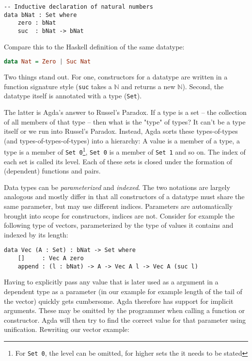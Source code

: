 \begin{lstlisting}[caption={Definition of a type representing the natural numbers},label={lst:tutorial:datatypes},emph={zero,suc}]
-- Inductive declaration of natural numbers
data bNat : Set where
    zero : bNat
    suc  : bNat -> bNat
\end{lstlisting}

Compare this to the Haskell definition of the same datatype:

\begin{lstlisting}[caption={Peano numbers in Haskell},label={lst:haskell:peano},language=haskell,emph={Zero,Suc}]
data Nat = Zero | Suc Nat
\end{lstlisting}

Two things stand out. For one, constructors for a datatype are written in a function signature style (\texttt{suc} takes a \texttt{$\mathbb N$} and returns a new \texttt{$\mathbb N$}). Second, the datatype itself is annotated with a type (\texttt{Set}).

The latter is Agda's answer to Russel's Paradox. If a type is a set -- the collection of all members of that type -- then what is the "type" of types? It can't be a type itself or we run into Russel's Paradox. Instead, Agda sorts these types-of-types (and types-of-types-of-types) into a hierarchy: A value is a member of a type, a type is a member of \texttt{Set 0}\footnote{For \texttt{Set 0}, the level can be omitted, for higher sets the it needs to be stated}, \texttt{Set 0} is a member of \texttt{Set 1} and so on. The index of each set is called its level. Each of these sets is closed under the formation of (dependent) functions and pairs.

Data types can be \emph{parameterized} and \emph{indexed}. The two notations are largely analogous and mostly differ in that all constructors of a datatype must share the same parameter, but may use different indices. Parameters are automatically brought into scope for constructors, indices are not. Consider for example the following type of vectors, parameterized by the type of values it contains and indexed by its length:

\begin{lstlisting}[caption={A simple vector type},label={lst:tutorial:vec},emph={Vec,append}]
data Vec (A : Set) : bNat -> Set where
    []     : Vec A zero
    append : (l : bNat) -> A -> Vec A l -> Vec A (suc l)
\end{lstlisting}

Having to explicitly pass any value that is later used as a argument in a dependent type as a parameter (in our example for example length of the tail of the vector) quickly gets cumbersome. Agda therefore has support for implicit arguments. These may be omitted by the programmer when calling a function or constructor. Agda will then try to find the correct value for that parameter using unification. Rewriting our vector example:

